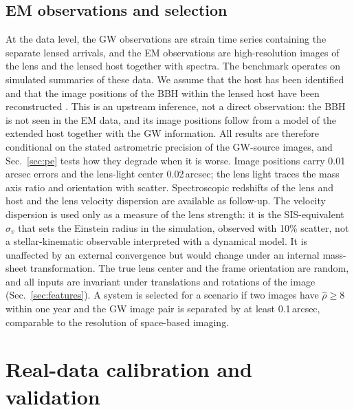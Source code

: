 \subsection{EM observations and selection}
At the data level, the GW observations are strain time series containing the separate lensed arrivals, and the EM observations are high-resolution images of the lens and the lensed host together with spectra. The benchmark operates on simulated summaries of these data. We assume that the host has been identified and that the image positions of the BBH within the lensed host have been reconstructed \citep{hannuksela2020localizing,wempe2022lensing,uronen2026galacticcentres}. This is an upstream inference, not a direct observation: the BBH is not seen in the EM data, and its image positions follow from a model of the extended host together with the GW information. All results are therefore conditional on the stated astrometric precision of the GW-source images, and Sec.~\ref{sec:pe} tests how they degrade when it is worse. Image positions carry 0.01\,arcsec errors and the lens-light center 0.02\,arcsec; the lens light traces the mass axis ratio and orientation with scatter. Spectroscopic redshifts of the lens and host and the lens velocity dispersion are available as follow-up. The velocity dispersion is used only as a measure of the lens strength: it is the SIS-equivalent $\sigma_v$ that sets the Einstein radius in the simulation, observed with 10\% scatter, not a stellar-kinematic observable interpreted with a dynamical model. It is unaffected by an external convergence but would change under an internal mass-sheet transformation. The true lens center and the frame orientation are random, and all inputs are invariant under translations and rotations of the image (Sec.~\ref{sec:features}). A system is selected for a scenario if two images have $\hat\rho\ge8$ within one year and the GW image pair is separated by at least 0.1\,arcsec, comparable to the resolution of space-based imaging.

\section{Real-data calibration and validation}
\label{sec:realdata}
